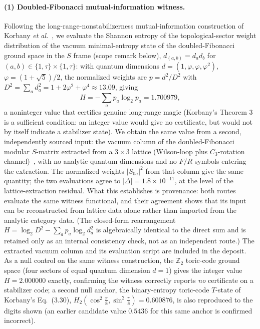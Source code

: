 \documentclass[aps,pra,twocolumn,superscriptaddress,longbibliography,floatfix,nofootinbib]{revtex4-2}
\begin{document}
\paragraph{(1) Doubled-Fibonacci mutual-information witness.} Following
the long-range-nonstabilizerness mutual-information construction of
Korbany \emph{et al.}~\cite{Korbany2026}, we evaluate the Shannon
entropy of the topological-sector weight distribution of the vacuum
minimal-entropy state of the doubled-Fibonacci ground space in the $S$
frame (scope remark below), $d_{(a,b)}=d_a d_b$ for
$(a,b)\in\{1,\tau\}\times\{1,\tau\}$: with quantum dimensions
$d=(1,\varphi,\varphi,\varphi^2)$, $\varphi=(1+\sqrt5)/2$, the
normalized weights are $p=d^2/D^2$ with
$D^2=\sum_a d_a^2=1+2\varphi^2+\varphi^4\approx13.09$, giving
\begin{equation}
H = -\sum_a p_a\log_2 p_a = 1.700979,
\end{equation}
a noninteger value that certifies genuine long-range magic (Korbany's
Theorem 3 is a sufficient condition: an integer value would give no
certificate, but would not by itself indicate a stabilizer state). We
obtain the same value from a second,
independently sourced input: the vacuum column of the doubled-Fibonacci
modular $S$-matrix extracted from a $3\times3$ lattice (Wilson-loop
plus $C_3$-rotation channel)~\cite{Sayim2026realspace}, with no analytic quantum dimensions and
no $F/R$ symbols entering the extraction. The normalized weights
$\lvert S_{0a}\rvert^2$ from that column give the same quantity; the
two evaluations agree to $\lvert\Delta\rvert=1.8\times10^{-11}$, at the
level of the lattice-extraction residual. What this establishes is
provenance: both
routes evaluate the same witness functional, and their agreement shows
that its input can be reconstructed from lattice data alone rather than
imported from the analytic category data. (The closed-form rearrangement
$H=\log_2 D^2-\sum_a p_a\log_2 d_a^2$ is algebraically identical to the
direct sum and is retained only as an internal consistency check, not
as an independent route.) The extracted vacuum column and its
evaluation script are included in the deposit. As a null control on the same
witness construction, the $\mathbb{Z}_2$ toric-code ground space
(four sectors of equal quantum dimension $d=1$) gives the integer
value $H=2.000000$ exactly, confirming the witness correctly reports
\emph{no} certificate on a stabilizer code; a second null anchor, the
binary-entropy toric-code $T$-state of Korbany's Eq.~(3.30),
$H_2(\cos^2\tfrac\pi8,\sin^2\tfrac\pi8)=0.600876$, is also reproduced
to the digits shown (an earlier candidate value $0.5436$ for this same
anchor is confirmed incorrect).
\end{document}
